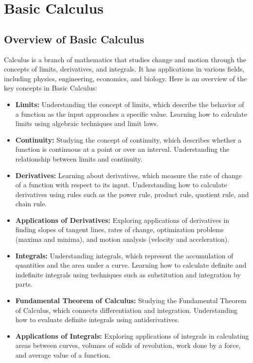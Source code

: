 \documentclass[openany]{book}
\begin{document}
\section{Basic Calculus}
\subsection{Overview of Basic Calculus}
Calculus is a branch of mathematics that studies change and motion through the concepts of limits, derivatives, and integrals. It has applications in various fields, including physics, engineering, economics, and biology. Here is an overview of the key concepts in Basic Calculus:
\begin{itemize}
    \item \textbf{Limits:} Understanding the concept of limits, which describe the behavior of a function as the input approaches a specific value. Learning how to calculate limits using algebraic techniques and limit laws.
    \item \textbf{Continuity:} Studying the concept of continuity, which describes whether a function is continuous at a point or over an interval. Understanding the relationship between limits and continuity.
    \item \textbf{Derivatives:} Learning about derivatives, which measure the rate of change of a function with respect to its input. Understanding how to calculate derivatives using rules such as the power rule, product rule, quotient rule, and chain rule.
    \item \textbf{Applications of Derivatives:} Exploring applications of derivatives in finding slopes of tangent lines, rates of change, optimization problems (maxima and minima), and motion analysis (velocity and acceleration).
    \item \textbf{Integrals:} Understanding integrals, which represent the accumulation of quantities and the area under a curve. Learning how to calculate definite and indefinite integrals using techniques such as substitution and integration by parts.
    \item \textbf{Fundamental Theorem of Calculus:} Studying the Fundamental Theorem of Calculus, which connects differentiation and integration. Understanding how to evaluate definite integrals using antiderivatives.
    \item \textbf{Applications of Integrals:} Exploring applications of integrals in calculating areas between curves, volumes of solids of revolution, work done by a force, and average value of a function.

\end{itemize}
\end{document}
